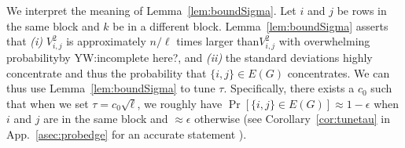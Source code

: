 We interpret the meaning of Lemma~\ref{lem:boundSigma}. Let $i$ and $j$ be rows in the same block and $k$ be in a different block. Lemma~\ref{lem:boundSigma} asserts that \emph{(i)} $V^2_{i,j}$ is approximately $n/\ell$ times larger than$V^2_{i, j}$ with overwhelming probability{\color{red}by YW:incomplete here?}, and \emph{(ii)} the standard deviations highly concentrate and thus the probability that $\{i, j\} \in E(G)$ concentrates. 
We can thus use Lemma~\ref{lem:boundSigma} to tune 
$\tau$. Specifically, there exists a $c_0$ such that when we set $\tau = c_0\sqrt{\ell}${}, we roughly have $\Pr[\{i, j\} \in E(G)] \approx 1-\epsilon$ when $i$ and $j$ are in the same block and $\approx \epsilon$ otherwise
(see Corollary~\ref{cor:tunetau} in App.~\ref{asec:probedge} for an accurate statement ).

\iffalse
Before proceeding, let us interpret the meaning of Lemma~\ref{lem:boundSigma}. Let $i_1, j_1 \in B_1$ and $j_2 \in B_2$. One can see that $V_{i,j_2}$ is much smaller than $V_{i,j_1}$ (in the order of $n /\ell$). This means: 

{\color{blue} Insert by YW

The result here implies that $V^2_{i,j} = \Theta(\ell)$ when $i$ and $j$ are in the same block. It is intuitive in the sense that responses ($\mY$) from the same block are spanned by $\ell$ common random variables.

For the case that $i$ and $j$ are not in the same block, $V^2_{i,j} = \Theta(\frac{\ell^2}{n}) = \Theta(\frac{\ell}{n}\ell)$. (How to articulate the meaning of $\ell/n$?)
}
\fi

